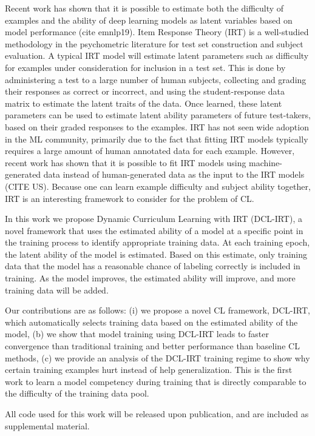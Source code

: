 \documentclass[letterpaper]{article} %
\begin{document}
Recent work has shown that it is possible to estimate both the difficulty of examples and the ability of deep learning models as latent variables based on model performance (cite emnlp19).
Item Response Theory (IRT) is a well-studied methodology in the psychometric literature for test set construction and subject evaluation.
A typical IRT model will estimate latent parameters such as difficulty for examples under consideration for inclusion in a test set.
This is done by administering a test to a large number of human subjects, collecting and grading their responses as correct or incorrect, and using the student-response data matrix to estimate the latent traits of the data.
Once learned, these latent parameters can be used to estimate latent ability parameters of future test-takers, based on their graded responses to the examples.
IRT has not seen wide adoption in the ML community, primarily due to the fact that fitting IRT models typically requires a large amount of human annotated data for each example.
However, recent work has shown that it is possible to fit IRT models using machine-generated data instead of human-generated data as the input to the IRT models (CITE US).
Because one can learn example difficulty and subject ability together, IRT is an interesting framework to consider for the problem of CL. 

In this work we propose Dynamic Curriculum Learning with IRT (DCL-IRT), a novel framework that uses the estimated ability of a model at a specific point in the training process to identify appropriate training data.
At each training epoch, the latent ability of the model is estimated.
Based on this estimate, only training data that the model has a reasonable chance of labeling correctly is included in training.
As the model improves, the estimated ability will improve, and more training data will be added.

Our contributions are as follows: (i) we propose a novel CL framework, DCL-IRT, which automatically selects training data based on the estimated ability of the model, (b) we show that model training using DCL-IRT leads to faster convergence than traditional training and better performance than baseline CL methods, (c) we provide an analysis of the DCL-IRT training regime to show why certain training examples hurt instead of help generalization.
This is the first work to learn a model competency during training that is directly comparable to the difficulty of the training data pool.

All code used for this work will be released upon publication, and are included as supplemental material.
\end{document}
